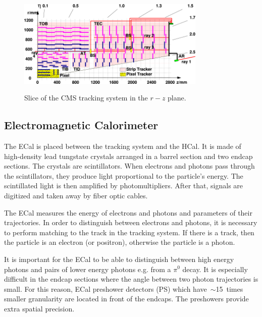 \begin{figure}[htb]
  \begin{center}
    {\includegraphics[width=0.8\textwidth]{../figs/Exp/tracker_slice.png}}
    \caption{Slice of the CMS tracking system in the $r-z$ plane.}
    \label{fig:tracker_slice}
  \end{center}
\end{figure}

\subsection{Electromagnetic Calorimeter}

The ECal is placed between the tracking system and the HCal. It is made of high-density lead tungstate crystals arranged in a barrel section and two endcap sections. The crystals are scintillators. When electrons and photons pass through the scintillators, they produce light proportional to the particle's energy. The scintillated light is then amplified by photomultipliers. After that, signals are digitized and taken away by fiber optic cables.

The ECal measures the energy of electrons and photons and parameters of their trajectories. In order to distinguish between electrons and photons, it is necessary to perform matching to the track in the tracking system. If there is a track, then the particle is an electron (or positron), otherwise the particle is a photon.

It is important for the ECal to be able to distinguish between high energy photons and pairs of lower energy photons e.g. from a $\pi^0$ decay. It is especially difficult in the endcap sections where the angle between two photon trajectories is small. For this reason, ECal preshower detectors (PS) which have~$\sim$15~times smaller granularity are located in front of the endcaps. The preshowers provide extra spatial precision. 


